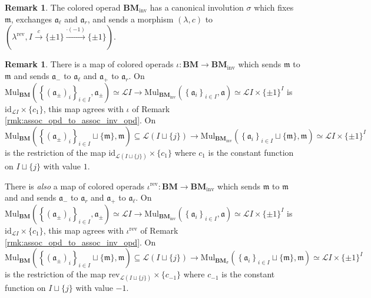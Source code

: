 \documentclass{article}
\theoremstyle{definition}
\newtheorem{remark}[equation]{Remark}
\begin{document}
\begin{remark}\label{rmk:bimod_opd_involution}
    The colored operad $ \mathbf{BM}_{\mathrm{inv}} $ has a canonical involution $ \sigma $ which fixes $ \mathfrak{m} $, exchanges $ \mathfrak{a}_\ell $ and $ \mathfrak{a}_r $, and sends a morphism $ (\lambda, c) $ to $ (\lambda^{\mathrm{rev}}, I \xrightarrow{c} \{\pm 1\} \xrightarrow{\cdot (-1)} \{\pm 1 \}) $. 
\end{remark}
\begin{remark}\label{rmk:bimod_opd_to_inv_bimod_opd}
    There is a map of colored operads $ \iota \colon \mathbf{BM} \to \mathbf{BM}_{\mathrm{inv}} $ which sends $ \mathfrak{m} $ to $ \mathfrak{m} $ and sends $ \mathfrak{a}_{-} $ to $ \mathfrak{a}_\ell $ and $ \mathfrak{a}_+ $ to $ \mathfrak{a}_r $. 
    On $ \mathrm{Mul}_{\mathbf{BM}}\left(\left\{(\mathfrak{a}_{\pm})_i\right\}_{i \in I}, \mathfrak{a}_{\pm}\right) \simeq  \mathcal{L}I \to \mathrm{Mul}_{\mathbf{BM}_\mathrm{inv}}\left(\left\{\mathfrak{a}_i\right\}_{i \in I}, \mathfrak{a}\right) \simeq  \mathcal{L}I \times \{\pm 1\}^I $  is $ \mathrm{id}_{\mathcal{L}I} \times \{ c_1\} $, this map agrees with $ \iota $ of Remark \ref{rmk:assoc_opd_to_assoc_inv_opd}. 
    On $ \mathrm{Mul}_{\mathbf{BM}}\left(\left\{(\mathfrak{a}_{\pm})_i\right\}_{i \in I} \sqcup\{\mathfrak{m}\}, \mathfrak{m}\right) \subseteq  \mathcal{L}(I\sqcup \{j\}) \to \mathrm{Mul}_{\mathbf{BM}_{\mathrm{inv}}}\left(\left\{\mathfrak{a}_i\right\}_{i \in I} \sqcup \{\mathfrak{m}\}, \mathfrak{m}\right) \simeq  \mathcal{L}I \times \{\pm 1\}^I $ is the restriction of the map $ \mathrm{id}_{\mathcal{L}(I\sqcup \{j\})} \times \{ c_1\} $ where $ c_1 $ is the constant function on $ I \sqcup \{j\} $ with value $ 1 $. 

    There is \emph{also} a map of colored operads $ \iota^{\mathrm{rev}} \colon \mathbf{BM} \to \mathbf{BM}_{\mathrm{inv}} $ which sends $ \mathfrak{m} $ to $ \mathfrak{m} $ and  and sends $ \mathfrak{a}_{-} $ to $ \mathfrak{a}_r $ and $ \mathfrak{a}_+ $ to $ \mathfrak{a}_\ell $. 
    On $ \mathrm{Mul}_{\mathbf{BM}}\left(\left\{(\mathfrak{a}_{\pm})_i\right\}_{i \in I}, \mathfrak{a}_{\pm}\right) \simeq  \mathcal{L}I \to \mathrm{Mul}_{\mathbf{BM}_{\mathrm{inv}}}\left(\left\{\mathfrak{a}_i\right\}_{i \in I}, \mathfrak{a}\right) \simeq  \mathcal{L}I \times \{\pm 1\}^I $  is $ \mathrm{id}_{\mathcal{L}I} \times \{ c_1\} $, this map agrees with $ \iota^{\mathrm{rev}} $ of Remark \ref{rmk:assoc_opd_to_assoc_inv_opd}. 
    On $ \mathrm{Mul}_{\mathbf{BM}}\left(\left\{(\mathfrak{a}_{\pm})_i\right\}_{i \in I} \sqcup\{\mathfrak{m}\}, \mathfrak{m}\right) \subseteq  \mathcal{L}(I\sqcup \{j\}) \to \mathrm{Mul}_{\mathbf{BM}_\sigma}\left(\left\{\mathfrak{a}_i\right\}_{i \in I} \sqcup \{\mathfrak{m}\}, \mathfrak{m}\right) \simeq  \mathcal{L}I \times \{\pm 1\}^I $ is the restriction of the map $ \mathrm{rev}_{\mathcal{L}(I\sqcup \{j\})} \times \{ c_{-1}\} $ where $ c_{-1} $ is the constant function on $ I \sqcup \{j\} $ with value $ -1 $. 
\end{remark}
\end{document}
